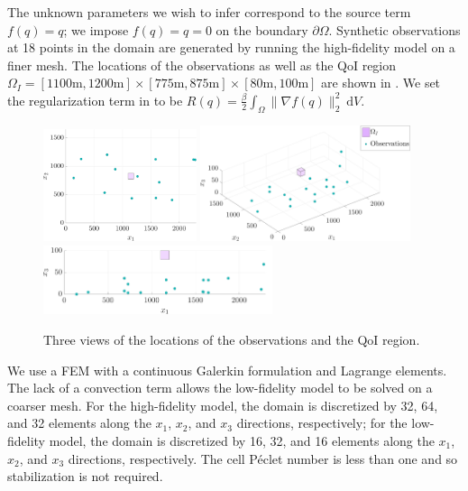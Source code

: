 \documentclass[review,sort&compress]{elsarticle}
\theoremstyle{plain} %
\theoremstyle{definition} %
\begin{document}
The unknown parameters we wish to infer correspond to the source term $f(q)=q$; we impose $f(q)=q=0$ on the boundary $\partial\Omega$. Synthetic observations at 18 points in the domain are generated by running the high-fidelity model on a finer mesh. The locations of the observations as well as the QoI region $\Omega_I=[1100\textrm{m},1200\textrm{m}]\times[775\textrm{m},875\textrm{m}]\times[80\textrm{m},100\textrm{m}]$ are shown in . We set the regularization term in  to be $R(q)=\frac{\beta}{2}\int_\Omega \|\nabla f(q)\|_2^2\:\textrm{d}V$.
%
\begin{figure}[htbp]
\centering
\includegraphics[width=0.4\textwidth]{series3D/setup_aerial_nolegend.pdf} \hfill
\includegraphics[width=0.55\textwidth]{series3D/setup_3view.pdf} \\
\vspace{\baselineskip}
\includegraphics[width=0.6\textwidth]{series3D/setup_side_view.pdf}
\caption{Three views of the locations of the observations and the QoI region.}
\label{fig:setup3D}
\end{figure}
%

We use a FEM with a continuous Galerkin formulation and Lagrange elements. The lack of a convection term allows the low-fidelity model to be solved on a coarser mesh. For the high-fidelity model, the domain is discretized by 32, 64, and 32 elements along the $x_1$, $x_2$, and $x_3$ directions, respectively; for the low-fidelity model, the domain is discretized by 16, 32, and 16 elements along the $x_1$, $x_2$, and $x_3$ directions, respectively. The cell P\'{e}clet number is less than one and so stabilization is not required.
\end{document}
